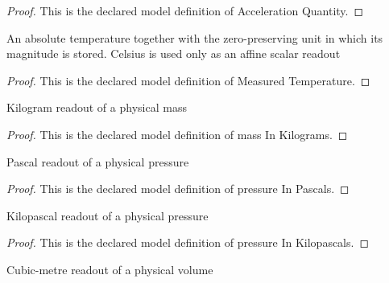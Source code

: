 \begin{proof}
  This is the declared model definition of Acceleration Quantity.
\end{proof}
\begin{definition}
  \label{def:physics:phyx-mini-0454:phyxminiproblems-problemphyxmini0454-measuredtemperature}
  An absolute temperature together with the zero-preserving unit in which its magnitude is stored. Celsius is used only as an affine scalar readout
\end{definition}
\begin{proof}
  This is the declared model definition of Measured Temperature.
\end{proof}
\begin{definition}
  \label{def:physics:phyx-mini-0454:phyxminiproblems-problemphyxmini0454-massinkilograms}
  Kilogram readout of a physical mass
\end{definition}
\begin{proof}
  This is the declared model definition of mass In Kilograms.
\end{proof}
\begin{definition}
  \label{def:physics:phyx-mini-0454:phyxminiproblems-problemphyxmini0454-pressureinpascals}
  Pascal readout of a physical pressure
\end{definition}
\begin{proof}
  This is the declared model definition of pressure In Pascals.
\end{proof}
\begin{definition}
  \label{def:physics:phyx-mini-0454:phyxminiproblems-problemphyxmini0454-pressureinkilopascals}
  Kilopascal readout of a physical pressure
\end{definition}
\begin{proof}
  This is the declared model definition of pressure In Kilopascals.
\end{proof}
\begin{definition}
  \label{def:physics:phyx-mini-0454:phyxminiproblems-problemphyxmini0454-volumeincubicmetres}
  Cubic-metre readout of a physical volume
\end{definition}
